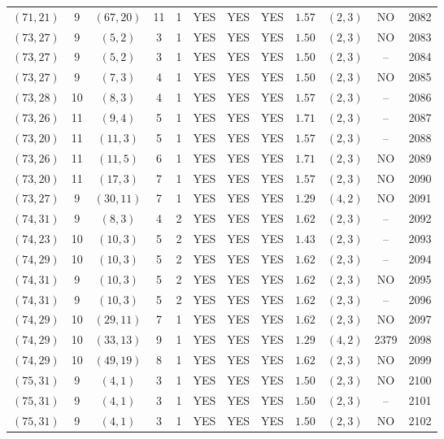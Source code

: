 \begin{longtable}{|c|c|c|c|c|c|c|c|c|c|c|c|}
$(71,21)$ & 9 & $(67,20)$ & 11 & 1 & YES & YES & YES & $1.57$ & $(2,3)$ & NO & 2082\\
$(73,27)$ & 9 & $(5,2)$ & 3 & 1 & YES & YES & YES & $1.50$ & $(2,3)$ & NO & 2083\\
$(73,27)$ & 9 & $(5,2)$ & 3 & 1 & YES & YES & YES & $1.50$ & $(2,3)$ & -- & 2084\\
$(73,27)$ & 9 & $(7,3)$ & 4 & 1 & YES & YES & YES & $1.50$ & $(2,3)$ & NO & 2085\\
$(73,28)$ & 10 & $(8,3)$ & 4 & 1 & YES & YES & YES & $1.57$ & $(2,3)$ & -- & 2086\\
$(73,26)$ & 11 & $(9,4)$ & 5 & 1 & YES & YES & YES & $1.71$ & $(2,3)$ & -- & 2087\\
$(73,20)$ & 11 & $(11,3)$ & 5 & 1 & YES & YES & YES & $1.57$ & $(2,3)$ & -- & 2088\\
$(73,26)$ & 11 & $(11,5)$ & 6 & 1 & YES & YES & YES & $1.71$ & $(2,3)$ & NO & 2089\\
$(73,20)$ & 11 & $(17,3)$ & 7 & 1 & YES & YES & YES & $1.57$ & $(2,3)$ & NO & 2090\\
$(73,27)$ & 9 & $(30,11)$ & 7 & 1 & YES & YES & YES & $1.29$ & $(4,2)$ & NO & 2091\\
$(74,31)$ & 9 & $(8,3)$ & 4 & 2 & YES & YES & YES & $1.62$ & $(2,3)$ & -- & 2092\\
$(74,23)$ & 10 & $(10,3)$ & 5 & 2 & YES & YES & YES & $1.43$ & $(2,3)$ & -- & 2093\\
$(74,29)$ & 10 & $(10,3)$ & 5 & 2 & YES & YES & YES & $1.62$ & $(2,3)$ & -- & 2094\\
$(74,31)$ & 9 & $(10,3)$ & 5 & 2 & YES & YES & YES & $1.62$ & $(2,3)$ & NO & 2095\\
$(74,31)$ & 9 & $(10,3)$ & 5 & 2 & YES & YES & YES & $1.62$ & $(2,3)$ & -- & 2096\\
$(74,29)$ & 10 & $(29,11)$ & 7 & 1 & YES & YES & YES & $1.62$ & $(2,3)$ & NO & 2097\\
$(74,29)$ & 10 & $(33,13)$ & 9 & 1 & YES & YES & YES & $1.29$ & $(4,2)$ & 2379 & 2098\\
$(74,29)$ & 10 & $(49,19)$ & 8 & 1 & YES & YES & YES & $1.62$ & $(2,3)$ & NO & 2099\\
$(75,31)$ & 9 & $(4,1)$ & 3 & 1 & YES & YES & YES & $1.50$ & $(2,3)$ & NO & 2100\\
$(75,31)$ & 9 & $(4,1)$ & 3 & 1 & YES & YES & YES & $1.50$ & $(2,3)$ & -- & 2101\\
$(75,31)$ & 9 & $(4,1)$ & 3 & 1 & YES & YES & YES & $1.50$ & $(2,3)$ & NO & 2102\\

\end{longtable}
